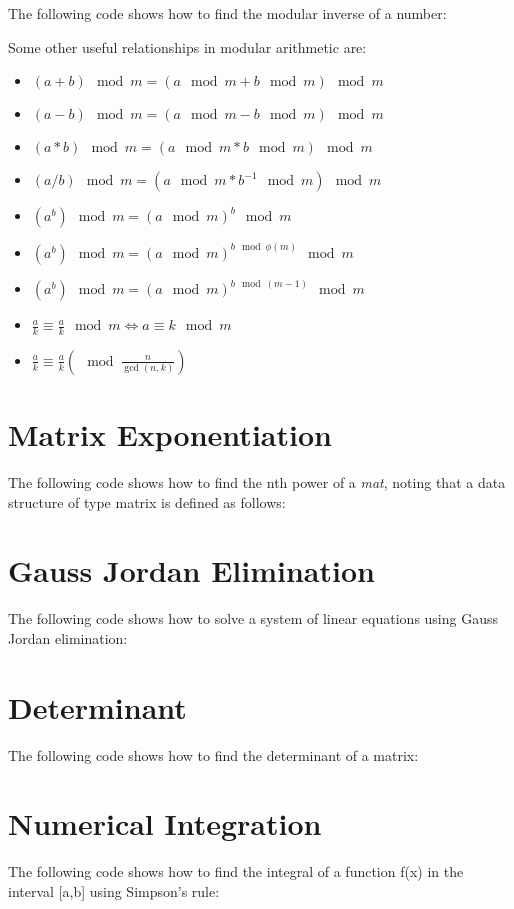 The following code shows how to find the modular inverse of a number:



Some other useful relationships in modular arithmetic are:

\begin{itemize}
\item $ (a+b) \mod m = (a \mod m + b \mod m) \mod m $
\item $ (a-b) \mod m = (a \mod m - b \mod m) \mod m $
\item $ (a*b) \mod m = (a \mod m * b \mod m) \mod m $
\item $ (a/b) \mod m = (a \mod m * b^{-1} \mod m) \mod m $
\item $ (a^b) \mod m = (a \mod m)^b \mod m $
\item $ (a^b) \mod m = (a \mod m)^{b \mod \phi(m)} \mod m $
\item $ (a^b) \mod m = (a \mod m)^{b \mod (m-1)} \mod m $
\item $ \frac{a}{k} \equiv \frac{a}{k} \mod m \iff a \equiv k \mod m $
\item $ \frac{a}{k} \equiv \frac{a}{k} \left( \mod \frac{n}{\gcd (n,k)}\right)$
\end{itemize}


\section{Matrix Exponentiation}

The following code shows how to find the nth power of a \textit{mat}, noting that a data structure of type matrix is defined as follows:




\section{Gauss Jordan Elimination}

The following code shows how to solve a system of linear equations using Gauss Jordan elimination:



\section{Determinant}

The following code shows how to find the determinant of a matrix:




\section{Numerical Integration}

The following code shows how to find the integral of a function f(x) in the interval [a,b] using Simpson's rule:

